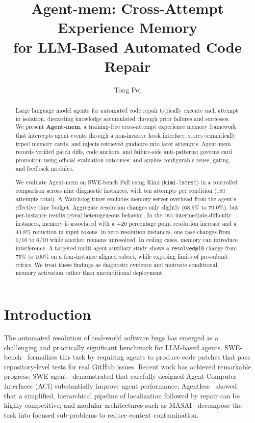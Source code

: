 \documentclass[runningheads]{llncs}
\title{Agent-mem: Cross-Attempt Experience Memory\\for LLM-Based Automated Code Repair}
\author{Tong Pei}
\institute{Vrije Universiteit Amsterdam, Amsterdam, The Netherlands\\
\email{TongPei\_9912@outlook.com}}
\begin{document}
\maketitle

\begin{abstract}
Large language model agents for automated code repair typically execute each attempt in isolation, discarding knowledge accumulated through prior failures and successes. We present \textbf{Agent-mem}, a training-free cross-attempt experience memory framework that intercepts agent events through a non-invasive hook interface, stores semantically typed memory cards, and injects retrieved guidance into later attempts. Agent-mem records verified patch diffs, code anchors, and failure-side anti-patterns; governs card promotion using official evaluation outcomes; and applies configurable reuse, gating, and feedback modules.

We evaluate Agent-mem on SWE-bench Full using Kimi (\texttt{kimi-latest}) in a controlled comparison across nine diagnostic instances, with ten attempts per condition (180 attempts total). A Watchdog timer excludes memory-server overhead from the agent's effective time budget. Aggregate resolution changes only slightly (68.9\% to 70.0\%), but per-instance results reveal heterogeneous behavior. In the two intermediate-difficulty instances, memory is associated with a $+$20 percentage point resolution increase and a 44.8\% reduction in input tokens. In zero-resolution instances, one case changes from 0/10 to 6/10 while another remains unresolved. In ceiling cases, memory can introduce interference. A targeted multi-agent auxiliary study shows a \texttt{resolved@10} change from 75\% to 100\% on a four-instance aligned subset, while exposing limits of pre-submit critics. We treat these findings as diagnostic evidence and motivate conditional memory activation rather than unconditional deployment.

\end{abstract}

\section{Introduction}

The automated resolution of real-world software bugs has emerged as a challenging and practically significant benchmark for LLM-based agents. SWE-bench~\cite{jimenez2024swebench} formalizes this task by requiring agents to produce code patches that pass repository-level tests for real GitHub issues. Recent work has achieved remarkable progress: SWE-agent~\cite{yang2024sweagent} demonstrated that carefully designed Agent-Computer Interfaces (ACI) substantially improve agent performance; Agentless~\cite{xia2024agentless} showed that a simplified, hierarchical pipeline of localization followed by repair can be highly competitive; and modular architectures such as MASAI~\cite{arora2024masai} decompose the task into focused sub-problems to reduce context contamination.
\end{document}
